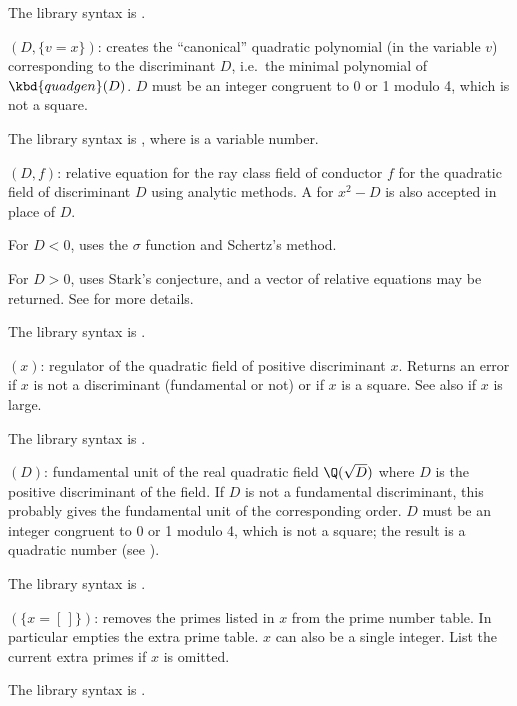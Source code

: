 The library syntax is .

$(D,\{v=x\})$: \label{se:quadpoly}creates the ``canonical'' quadratic
polynomial (in the variable $v$) corresponding to the discriminant $D$,
i.e.~the minimal polynomial of $\kbd{quadgen}(D)$. $D$ must be an integer
congruent to 0 or 1 modulo 4, which is not a square.

The library syntax is , where  is a variable number.

$(D,f)$: \label{se:quadray}relative equation for the ray
class field of conductor $f$ for the quadratic field of discriminant $D$
using analytic methods. A  for $x^2 - D$ is also accepted in place
of $D$.

For $D < 0$, uses the $\sigma$ function and Schertz's method.

For $D>0$, uses Stark's conjecture, and a vector of relative equations may be
returned. See  for more details.

The library syntax is .

$(x)$: \label{se:quadregulator}regulator of the quadratic field of positive discriminant $x$. Returns
an error if $x$ is not a discriminant (fundamental or not) or if $x$ is a
square. See also  if $x$ is large.

The library syntax is .

$(D)$: \label{se:quadunit}fundamental unit of the
real quadratic field $\Q(\sqrt D)$ where  $D$ is the positive discriminant
of the field. If $D$ is not a fundamental discriminant, this probably gives
the fundamental unit of the corresponding order. $D$ must be an integer
congruent to 0 or 1 modulo 4, which is not a square; the result is a
quadratic number (see ).

The library syntax is .

$(\{x=[\,]\})$: \label{se:removeprimes}removes the primes listed in $x$ from
the prime number table. In particular  empties
the extra prime table. $x$ can also be a single integer. List the current
extra primes if $x$ is omitted.

The library syntax is .

